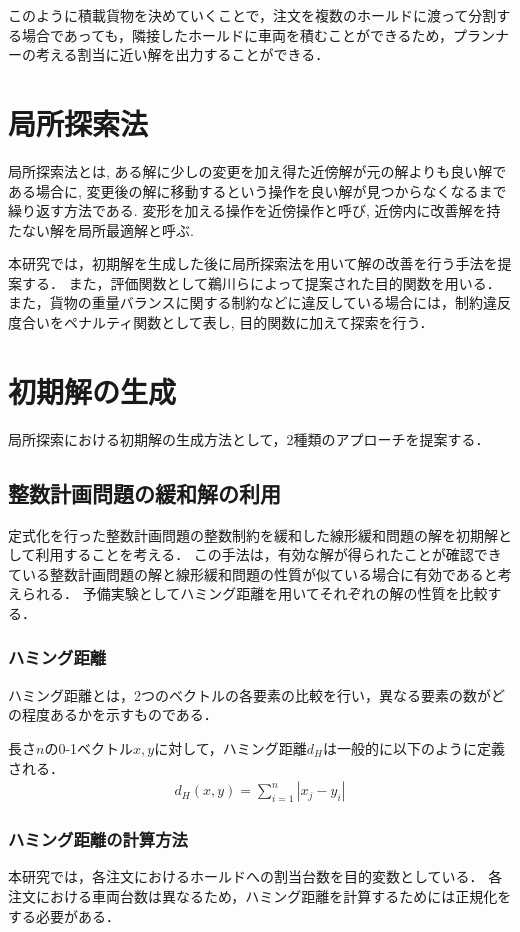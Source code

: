 このように積載貨物を決めていくことで，注文を複数のホールドに渡って分割する場合であっても，隣接したホールドに車両を積むことができるため，プランナーの考える割当に近い解を出力することができる．

\section{局所探索法}
局所探索法とは, ある解に少しの変更を加え得た近傍解が元の解よりも良い解である場合に, 変更後の解に移動するという操作を良い解が見つからなくなるまで繰り返す方法である.
変形を加える操作を近傍操作と呼び, 近傍内に改善解を持たない解を局所最適解と呼ぶ.

本研究では，初期解を生成した後に局所探索法を用いて解の改善を行う手法を提案する．
また，評価関数として鵜川らによって提案された目的関数\cite{ukawa}を用いる．
また，貨物の重量バランスに関する制約などに違反している場合には，制約違反度合いをペナルティ関数として表し, 目的関数に加えて探索を行う．

\section{初期解の生成}
\label{初期解}
局所探索における初期解の生成方法として，2種類のアプローチを提案する．
\subsection{整数計画問題の緩和解の利用}
定式化を行った整数計画問題の整数制約を緩和した線形緩和問題の解を初期解として利用することを考える．
この手法は，有効な解が得られたことが確認できている整数計画問題の解と線形緩和問題の性質が似ている場合に有効であると考えられる．
予備実験としてハミング距離を用いてそれぞれの解の性質を比較する．

\subsubsection{ハミング距離}
ハミング距離とは，2つのベクトルの各要素の比較を行い，異なる要素の数がどの程度あるかを示すものである．

長さ$n$の0-1ベクトル$x,y$に対して，ハミング距離$d_H$は一般的に以下のように定義される．
\begin{align*}
 d_H(x,y) =\sum_{i=1}^n |x_j-y_i|
\end{align*}

\subsubsection{ハミング距離の計算方法}
本研究では，各注文におけるホールドへの割当台数を目的変数としている．
各注文における車両台数は異なるため，ハミング距離を計算するためには正規化をする必要がある．

